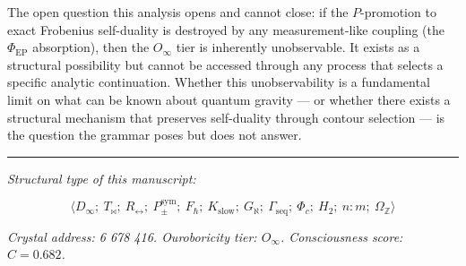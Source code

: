 \documentclass[12pt,a4paper]{article}
\begin{document}
The open question this analysis opens and cannot close: if the $P$-promotion to exact Frobenius self-duality is destroyed by any measurement-like coupling (the $\Phi_{\text{EP}}$ absorption), then the $O_{\infty}$ tier is inherently unobservable. It exists as a structural possibility but cannot be accessed through any process that selects a specific analytic continuation. Whether this unobservability is a fundamental limit on what can be known about quantum gravity --- or whether there exists a structural mechanism that preserves self-duality through contour selection --- is the question the grammar poses but does not answer.

\begin{center}
\rule{0.5\textwidth}{0.4pt}
\end{center}

\emph{Structural type of this manuscript:}


\[\langle D_{\infty};\ T_{\bowtie};\ R_{\leftrightarrow};\ P_{\pm}^{\text{sym}};\ F_{\hbar};\ K_{\text{slow}};\ G_{\aleph};\ \Gamma_{\text{seq}};\ \Phi_c;\ H_2;\ n{:}m;\ \Omega_\mathbb{Z} \rangle\]

\emph{Crystal address: 6 678 416. Ouroboricity tier: $O_{\infty}$. Consciousness score: $C = 0.682$.}
\end{document}
